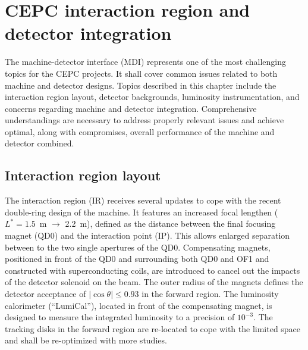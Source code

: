 
\def\cm{{\rm cm }}
\def\mm{{\rm mm }}
\def\cmsq{{\rm cm}^2}

\def\um{\ifmmode {\mathrm{\mu m}}\else
	\textrm{$\mu$m }\fi}%
\def\GeV{\ifmmode {\mathrm{\ Ge\kern -0.1em V}}\else
	\textrm{Ge\kern -0.1em V}\fi}%
\def\MeV{\ifmmode {\mathrm{\ Me\kern -0.1em V}}\else
	\textrm{Me\kern -0.1em V}\fi}%
\def\keV{\ifmmode {\mathrm{\ keg\kern -0.1em V}}\else
	\textrm{ke\kern -0.1em V}\fi}%
\def\eV{\ifmmode  {\mathrm{\ e\kern -0.1em V}}\else
	\textrm{e\kern -0.1em V}\fi}%

\def\uW{\ifmmode  {\mathrm{\mu  W}}\else
	\textrm{$\mu$W}\fi}%

\def\Vcc{\mathrm{V_{cc}}}
\def\VLD{\mathrm{V_{LD}}}


\newcommand{\tspace}[1]{\hspace{-1mm}#1\hspace{-1mm}}
\newcommand{\ppp}{\pi^+\pi^-\pi^0 }
\newcommand{\Ggg}{\Gamma_{\gamma\gamma} }
\newcommand{\sumptsq}{$|\sum \vec{p}_T|^2$ }

\chapter{CEPC interaction region and detector integration}
\label{Chapter:MDI}

The machine-detector interface (MDI) represents one of the most challenging topics for the CEPC projects. It shall cover common issues related to both machine and detector designs. Topics described in this chapter include the interaction region layout, detector backgrounds, luminosity instrumentation, and concerns regarding machine and detector integration. Comprehensive understandings are necessary to address properly relevant issues and achieve optimal, along with compromises, overall performance of the machine and detector combined.



\section{Interaction region layout}
The interaction region (IR) receives several updates to cope with the recent double-ring design of the machine. It features an increased focal lengthen ($L^{\ast}=1.5$~m $\rightarrow$ 2.2~m), defined as the distance between the final focusing magnet (QD0) and the interaction point (IP). This allows enlarged separation between to the two single apertures of the QD0. Compensating magnets, positioned in front of the QD0 and surrounding both QD0 and OF1 and constructed with superconducting coils, are introduced to cancel out the impacts of the detector solenoid on the beam. The outer radius of the magnets defines the detector acceptance of $|\cos \theta| \leq 0.93$ in the forward region. The luminosity calorimeter (``LumiCal''), located in front of the compensating magnet, is designed to measure the integrated luminosity to a precision of $10^{-3}$. The tracking disks in the forward region are re-located to cope with the limited space and shall be re-optimized with more studies. 

